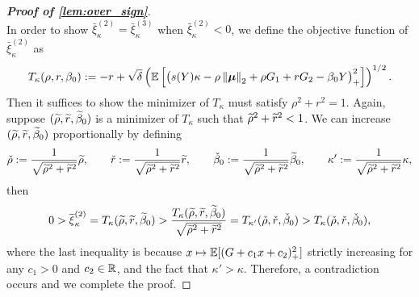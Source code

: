 \begin{proof}[\textbf{Proof of \cref{lem:over_sign}}]
~\\
\noindent
In order to show $\bar\xi_{\kappa}^{(2)} = \bar\xi_{\kappa}^{(3)}$ when $\bar\xi_{\kappa}^{(2)} < 0$, we define the objective function of $\bar\xi_{\kappa}^{(2)}$ as
\begin{equation*}
    T_{\kappa}(\rho, r, \beta_0) := - r + \sqrt{\delta} \left( \mathbb{E}\left[ \bigl(  s(Y) \kappa - \rho \left\|{\text{\boldmath $\mu$}}\right\|_2 + \rho G_1 + rG_2 - \beta_0 Y \bigr)_+^2 \right] \right)^{1/2}.
\end{equation*}
Then it suffices to show the minimizer of $T_{\kappa}$ must satisfy $\rho^2 + r^2 = 1$. Again, suppose $(\widetilde\rho, \widetilde r, \widetilde\beta_0)$ is a minimizer of $T_{\kappa}$ such that $\widetilde\rho^2 + \widetilde r^2 < 1$. We can increase $(\widetilde\rho, \widetilde r, \widetilde\beta_0)$ proportionally by defining
\begin{equation*}
        \check\rho := \frac{1}{\sqrt{\widetilde\rho^2 + \widetilde r^2}} \widetilde\rho, \qquad
        \check r := \frac{1}{\sqrt{\widetilde\rho^2 + \widetilde r^2}} \widetilde r,  \qquad
        \check\beta_0 := \frac{1}{\sqrt{\widetilde\rho^2 + \widetilde r^2}} \widetilde\beta_0,  \qquad
        \kappa' := \frac{1}{\sqrt{\widetilde\rho^2 + \widetilde r^2}} \kappa,
\end{equation*}
then
\begin{equation*}
    0 > \overline\xi_{\kappa}^{(2)} = T_{\kappa}(\widetilde\rho, \widetilde r, \widetilde\beta_0) 
    > 
    \frac{T_{\kappa}(\widetilde\rho, \widetilde r, \widetilde\beta_0) }{\sqrt{\widetilde\rho^2 + \widetilde r^2}} 
    =
    T_{\kappa'}(\check\rho, \check r, \check\beta_0) 
    >
    T_{\kappa}(\check\rho, \check r, \check\beta_0),
\end{equation*}
where the last inequality is because $x \mapsto \mathbb{E}[(G + c_1 x + c_2)_+^2]$ strictly increasing for any $c_1 > 0$ and $c_2 \in \mathbb{R}$, and the fact that $\kappa' > \kappa$. Therefore, a contradiction occurs and we complete the proof.
\end{proof}
















